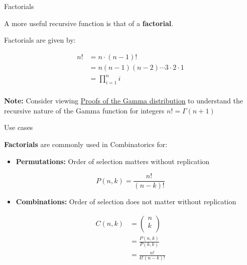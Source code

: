 \begin{frame}{Factorials}

A more useful recursive function is that of a \textbf{factorial}.

Factorials are given by:

\[\begin{aligned}
  n! &= n \cdot \left( {n - 1} \right)!  \\
   &= n\left( {n - 1} \right)\left( {n - 2} \right) \cdots 3 \cdot 2 \cdot 1  \\
   &= \prod\limits_{i = 1}^n i   \\ 
\end{aligned}\]

\textbf{Note:} Consider viewing
\href{http://thecoatlessprofessor.com/statistics/proofs-of-gamma-distribution/}{Proofs
of the Gamma distribution} to understand the recursive nature of the
Gamma function for integers \(n! = \Gamma \left( {n + 1} \right)\)

\end{frame}

\begin{frame}{Use cases}

\textbf{Factorials} are commonly used in Combinatorics for:

\begin{itemize}
\tightlist
\item
  \textbf{Permutations:} Order of selection matters without replication
\end{itemize}

\[P\left( {n,k} \right) = \frac{{n!}}{{\left( {n - k} \right)!}}\]

\begin{itemize}
\tightlist
\item
  \textbf{Combinations:} Order of selection does not matter without
  replication
\end{itemize}

\[\begin{aligned}
C\left( {n,k} \right) &=\left( \begin{gathered}
  n  \\
  k  \\ 
\end{gathered}  \right) \\
&=  \frac{{P\left( {n,k} \right)}}{{P\left( {k,k} \right)}} \\
&= \frac{{n!}}{{k!\left( {n - k} \right)!}}
\end{aligned}\]

\end{frame}

